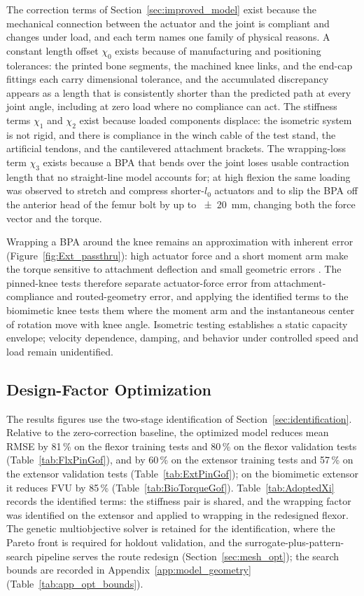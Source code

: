 The correction terms of Section~\ref{sec:improved_model} exist because the mechanical connection between the actuator and the joint is compliant and changes under load, and each term names one family of physical reasons. A constant length offset $\chi_{0}$ exists because of manufacturing and positioning tolerances: the printed bone segments, the machined knee links, and the end-cap fittings each carry dimensional tolerance, and the accumulated discrepancy appears as a length that is consistently shorter than the predicted path at every joint angle, including at zero load where no compliance can act. The stiffness terms $\chi_{1}$ and $\chi_{2}$ exist because loaded components displace: the isometric system is not rigid, and there is compliance in the winch cable of the test stand, the artificial tendons, and the cantilevered attachment brackets. The wrapping-loss term $\chi_{3}$ exists because a BPA that bends over the joint loses usable contraction length that no straight-line model accounts for; at high flexion the same loading was observed to stretch and compress shorter-$l_{0}$ actuators and to slip the BPA off the anterior head of the femur bolt by up to \qty{\pm 20}{\mm}, changing both the force vector and the torque.

Wrapping a BPA around the knee remains an approximation with inherent error (Figure~\ref{fig:Ext_passthru}): high actuator force and a short moment arm make the torque sensitive to attachment deflection and small geometric errors \citep{young_analyzing_2019}. The pinned-knee tests therefore separate actuator-force error from attachment-compliance and routed-geometry error, and applying the identified terms to the biomimetic knee tests them where the moment arm and the instantaneous center of rotation move with knee angle. Isometric testing establishes a static capacity envelope; velocity dependence, damping, and behavior under controlled speed and load remain unidentified.

\subsection{Design-Factor Optimization}\label{sec:ongoing}

The results figures use the two-stage identification of Section~\ref{sec:identification}. Relative to the zero-correction baseline, the optimized model reduces mean RMSE by 81\,\% on the flexor training tests and 80\,\% on the flexor validation tests (Table~\ref{tab:FlxPinGof}), and by 60\,\% on the extensor training tests and 57\,\% on the extensor validation tests (Table~\ref{tab:ExtPinGof}); on the biomimetic extensor it reduces FVU by 85\,\% (Table~\ref{tab:BioTorqueGof}). Table~\ref{tab:AdoptedXi} records the identified terms: the stiffness pair is shared, and the wrapping factor was identified on the extensor and applied to wrapping in the redesigned flexor. The genetic multiobjective solver is retained for the identification, where the Pareto front is required for holdout validation, and the surrogate-plus-pattern-search pipeline serves the route redesign (Section~\ref{sec:mesh_opt}); the search bounds are recorded in Appendix~\ref{app:model_geometry} (Table~\ref{tab:app_opt_bounds}).

